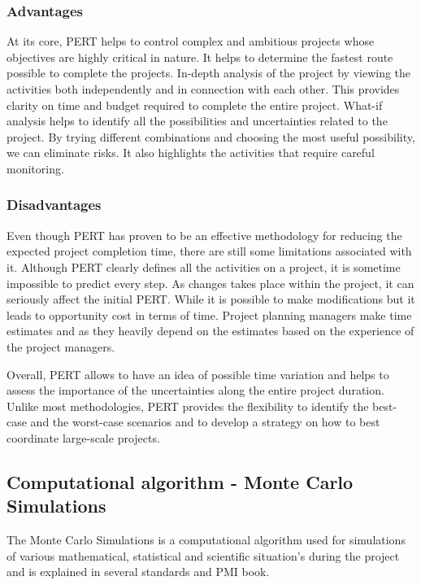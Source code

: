 \subsubsection{Advantages}

At its core, PERT helps to control complex and ambitious projects whose objectives are highly critical in nature. It helps to determine the fastest route possible to complete the projects. In-depth analysis of the project by viewing the activities both independently and in connection with each other. This provides clarity on time and budget required to complete the entire project.
What-if analysis helps to identify all the possibilities and uncertainties related to the project. By trying different combinations and choosing the most useful possibility, we can eliminate risks. It also highlights the activities that require careful monitoring.


\subsubsection{Disadvantages}

Even though PERT has proven to be an effective methodology for reducing the expected project completion time, there are still some limitations associated with it.
Although PERT clearly defines all the activities on a project, it is sometime impossible to predict every step. As changes takes place within the project, it can seriously affect the initial PERT. While it is possible to make modifications but it leads to opportunity cost in terms of time.
Project planning managers make time estimates and as they heavily depend on the estimates based on the experience of the project managers.

Overall, PERT allows to have an idea of possible time variation and helps to assess the importance of the uncertainties along the entire project duration. Unlike most methodologies, PERT provides the flexibility to identify the best-case and the worst-case scenarios and to develop a strategy on how to best coordinate large-scale projects. 


\subsection{Computational algorithm - Monte Carlo Simulations}

The Monte Carlo Simulations is a computational algorithm used for simulations of various mathematical, statistical and scientific situation's during the project and is explained in several standards and PMI book\cite{Sandra}.

